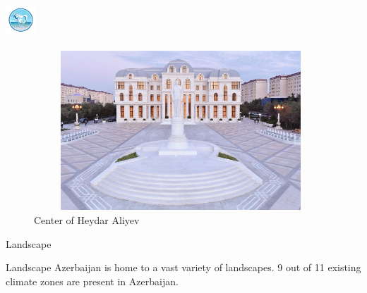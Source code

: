 \documentclass[hyperref={pdfpagemode=FullScreen}]{beamer}
\begin{document}
\begin{frame}{\includegraphics[width=1.1cm, height=1.3cm]{img/sum04.png}}
    \begin{figure}
      \includegraphics[width=11cm, height=6cm]{img/sum03.jpg}
        \caption{Center of Heydar Aliyev} 
    \end{figure}
\end{frame}

\begin{frame}{Landscape}
\begin{alertblock}{Landscape}
Azerbaijan is home to a vast variety of landscapes.
9 out of 11 existing climate zones are present in
Azerbaijan.
\end{alertblock}
\end{frame}
\end{document}
